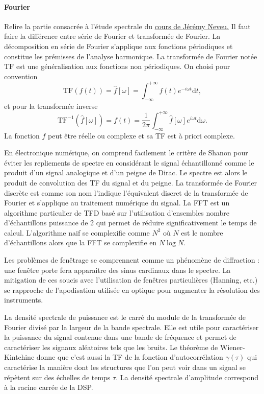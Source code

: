 \documentclass[12pt,a4paper]{article}
\renewcommand{\d}{\mathrm{d}}
\newcommand{\tf}{\mathrm{TF}}
\begin{document}
\paragraph{Fourier\\}
Relire la partie consacrée à l'étude spectrale du \href{https://gitlab.in2p3.fr/Jeremy/Electronique/-/blob/master/Cours/electronique.pdf}{cours de Jérémy Neveu.}
Il faut faire la différence entre série de Fourier et transformée de Fourier.
La décomposition en série de Fourier s'applique aux fonctions périodiques et constitue les prémisses de l'analyse harmonique.
La transformée de Fourier notée $\tf$ est une généralisation aux fonctions non périodiques.
On choisi pour convention 
\begin{equation}
\tf (f(t)) = \hat{f}[\omega] = \int_{-\infty}^{+\infty} f(t) e^{-i\omega t} \d t,
\end{equation}
et pour la transformée inverse
\begin{equation}
\tf^{-1} (\hat{f}[\omega]) = f(t) = \frac{1}{2\pi}\int_{-\infty}^{+\infty} \hat{f}[\omega] e^{i\omega t} \d \omega.
\end{equation}
La fonction $f$ peut être réelle ou complexe et sa TF est à priori complexe.

En électronique numérique, on comprend facilement le critère de Shanon pour éviter les repliements de spectre en considérant le signal échantillonné comme le produit d'un signal analogique et d'un peigne de Dirac.
Le spectre est alors le produit de convolution des TF du signal et du peigne.
La transformée de Fourier discrète est comme son nom l'indique l'équivalent discret de la transformée de Fourier et s'applique au traitement numérique du signal.
La FFT est un algorithme particulier de TFD basé sur l'utilisation d'ensembles nombre d'échantillons puissance de 2 qui permet de réduire significativement le temps de calcul.
L'algorithme naif se complexifie comme $N^2$ où $N$ est le nombre d'échantillons alors que la FFT se complexifie en $N\log N$.

Les problèmes de fenêtrage se comprennent comme un phénomène de diffraction : une fenêtre porte fera apparaitre des sinus cardinaux dans le spectre.
La mitigation de ces soucis avec l'utilisation de fenêtres particulières (Hanning, etc.) se rapproche de l'apodisation utilisée en optique pour augmenter la résolution des instruments.

La densité spectrale de puissance est le carré du module de la transformée de Fourier divisé par la largeur de la bande spectrale.
Elle est utile pour caractériser la puissance du signal contenue dans une bande de fréquence et permet de caractériser les signaux aléatoires tels que les bruits.
Le théorème de Wiener-Kintchine donne que c'est aussi la TF de la fonction d'autocorrélation $\gamma(\tau)$ qui caractérise la manière dont les structures que l'on peut voir dans un signal se répètent sur des échelles de temps $\tau$.
La densité spectrale d'amplitude correspond à la racine carrée de la DSP.
\end{document}
